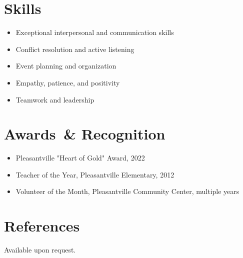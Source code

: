 \documentclass[11pt,a4paper]{article}
\begin{document}
\section*{Skills}
\begin{itemize}[leftmargin=*]
    \item Exceptional interpersonal and communication skills
    \item Conflict resolution and active listening
    \item Event planning and organization
    \item Empathy, patience, and positivity
    \item Teamwork and leadership
\end{itemize}

\section*{Awards \,\& Recognition}
\begin{itemize}[leftmargin=*]
    \item Pleasantville "Heart of Gold" Award, 2022
    \item Teacher of the Year, Pleasantville Elementary, 2012
    \item Volunteer of the Month, Pleasantville Community Center, multiple years
\end{itemize}

\section*{References}
Available upon request.
\end{document}
